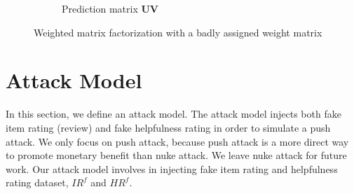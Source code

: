 \documentclass[master,english,final]{kaist-ucs}
\begin{document}
\begin{figure}[h]
\begin{subfigure}[b]{0.3\textwidth}
        \caption{Prediction matrix $\bm{UV}$}
        \label{wmf_bad_prediction}
    \end{subfigure}
    \caption{Weighted matrix factorization with a badly assigned weight matrix}
    \label{wmf_bad}
\end{figure}


\section{Attack Model}
In this section, we define an attack model.
The attack model injects both fake item rating (review) and fake helpfulness rating in order to simulate a push attack.
We only focus on push attack, because push attack is a more direct way to promote monetary benefit than nuke attack.
We leave nuke attack for future work.
Our attack model involves in injecting fake item rating and helpfulness rating dataset, $IR^f$ and $HR^f$.
\end{document}
